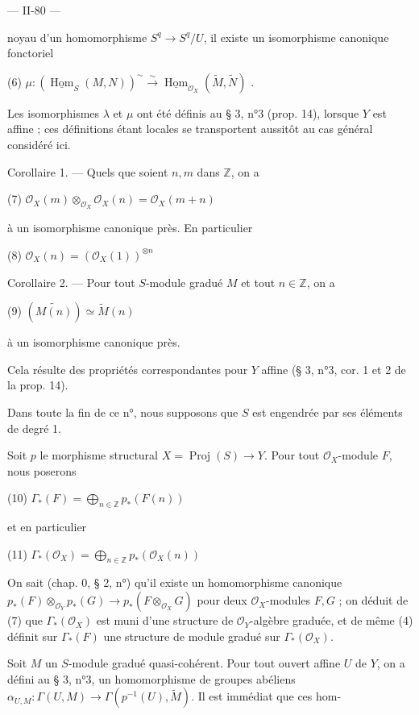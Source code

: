 \newpage


— II-80 —

noyau d'un homomorphisme $S^q \to S^q / U$, il existe un isomorphisme canonique fonctoriel

(6) $\mu : (\underline{\operatorname{Hom}}_S(M,N))^{\sim} \xrightarrow{\sim} \underline{\operatorname{Hom}}_{\mathcal{O}_X}(\tilde{M}, \tilde{N})$ .

Les isomorphismes $\lambda$ et $\mu$ ont été définis au § 3, n°3 (prop. 14), lorsque $Y$ est affine ; ces définitions étant locales se transportent aussitôt au cas général considéré ici.

Corollaire 1. — Quels que soient $n,m$ dans $\mathbb{Z}$, on a

(7) $\mathcal{O}_X(m) \otimes_{\mathcal{O}_X} \mathcal{O}_X(n) = \mathcal{O}_X(m+n)$

à un isomorphisme canonique près. En particulier

(8) $\mathcal{O}_X(n) = (\mathcal{O}_X(1))^{\otimes n}$

Corollaire 2. — Pour tout $S$-module gradué $M$ et tout $n \in \mathbb{Z}$, on a

(9) $(\widetilde{M(n)}) \simeq \tilde{M}(n)$

à un isomorphisme canonique près.

Cela résulte des propriétés correspondantes pour $Y$ affine (§ 3, n°3, cor. 1 et 2 de la prop. 14).

Dans toute la fin de ce n°, nous supposons que $S$ est engendrée par ses éléments de degré 1.

Soit $p$ le morphisme structural $X = \operatorname{Proj}(S) \to Y$. Pour tout $\mathcal{O}_X$-module $F$, nous poserons

(10) $\Gamma_*(F) = \bigoplus_{n \in \mathbb{Z}} p_*(F(n))$

et en particulier

(11) $\Gamma_*(\mathcal{O}_X) = \bigoplus_{n \in \mathbb{Z}} p_*(\mathcal{O}_X(n))$

On sait (chap. 0, § 2, n°) qu'il existe un homomorphisme canonique $p_*(F) \otimes_{\mathcal{O}_Y} p_*(G) \to p_*(F \otimes_{\mathcal{O}_X} G)$ pour deux $\mathcal{O}_X$-modules $F, G$ ; on déduit de (7) que $\Gamma_*(\mathcal{O}_X)$ est muni d'une structure de $\mathcal{O}_Y$-algèbre graduée, et de même (4) définit sur $\Gamma_*(F)$ une structure de module gradué sur $\Gamma_*(\mathcal{O}_X)$.

Soit $M$ un $S$-module gradué quasi-cohérent. Pour tout ouvert affine $U$ de $Y$, on a défini au § 3, n°3, un homomorphisme de groupes abéliens $\alpha_{U,M} : \Gamma(U, M) \to \Gamma(p^{-1}(U), \tilde{M})$. Il est immédiat que ces hom-

